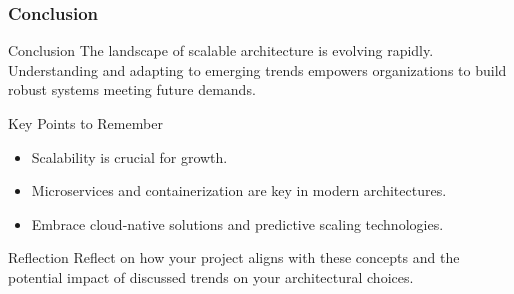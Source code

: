 \documentclass[aspectratio=169]{beamer}
\begin{document}
\begin{frame}[fragile]
    \frametitle{Conclusion}
    
    \begin{block}{Conclusion}
        The landscape of scalable architecture is evolving rapidly. 
        Understanding and adapting to emerging trends empowers organizations to build robust systems meeting future demands.
    \end{block}
    
    \begin{block}{Key Points to Remember}
        \begin{itemize}
            \item Scalability is crucial for growth.
            \item Microservices and containerization are key in modern architectures.
            \item Embrace cloud-native solutions and predictive scaling technologies.
        \end{itemize}
    \end{block}
    
    \begin{block}{Reflection}
        Reflect on how your project aligns with these concepts and the potential impact of discussed trends on your architectural choices.
    \end{block}
\end{frame}
\end{document}
